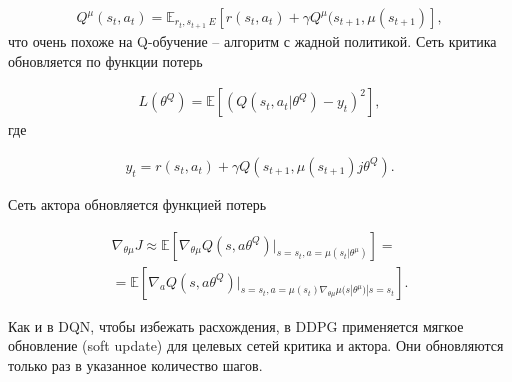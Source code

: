 \begin{equation}
    \label{eq:ch1-ddpg-1}
    \begin{multlined}
        Q^\mu (s_t, a_t) = \mathbb{E}_{r_t, s_{t+1}~E}[r(s_t, a_t) + \gamma Q^\mu(s_{t+1}, \mu(s_{t+1})],
    \end{multlined}
\end{equation}
что очень похоже на Q-обучение – алгоритм с жадной политикой. Сеть критика обновляется по функции потерь

\begin{equation}
    \label{eq:ch1-ddpg-1}
    \begin{multlined}
        L(\theta^Q) = \mathbb{E}[(Q(s_t, a_t|\theta^Q) - y_t)^2],
    \end{multlined}
\end{equation}
где

\begin{equation}
    \label{eq:ch1-ddpg-3}
    \begin{multlined}
        y_t = r(s_t, a_t) + \gamma Q(s_{t+1}, \mu(s_{t+1})j\theta^Q).
    \end{multlined}
\end{equation}

Сеть актора обновляется функцией потерь

\begin{equation}
    \label{eq:ch1-ddpg-4}
    \begin{multlined}
        \nabla_{\theta \mu} J \approx \mathbb{E}[\nabla_{\theta \mu} Q(s, a \theta^Q)|_{s=s_t,a=\mu(s_t|\theta^\mu)}] = \\
        = \mathbb{E}[\nabla_a Q(s, a \theta^Q)|_{s=s_t,a=\mu(s_t) \nabla_{\theta \mu} \mu (s|\theta^\mu)|s=s_t}].
    \end{multlined}
\end{equation}

Как и в DQN, чтобы избежать расхождения, в DDPG применяется мягкое обновление (soft update) для целевых сетей критика и актора. Они обновляются только раз в указанное количество шагов.
